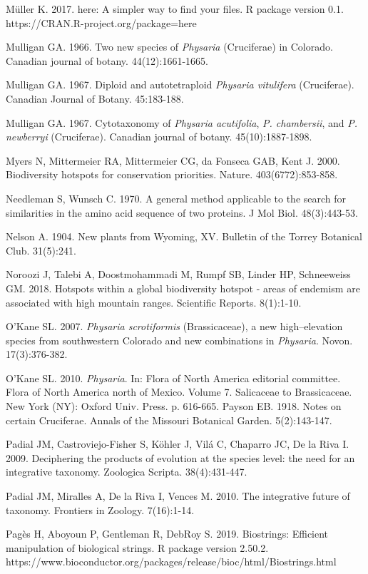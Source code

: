 Müller K. 2017. here: A simpler way to find your files. R package version 0.1. https://CRAN.R-project.org/package=here

Mulligan GA. 1966. Two new species of \textit{Physaria} (Cruciferae) in Colorado. Canadian journal of botany. 44(12):1661-1665.

Mulligan GA. 1967. Diploid and autotetraploid \textit{Physaria vitulifera} (Cruciferae). Canadian Journal of Botany. 45:183-188.

Mulligan GA. 1967. Cytotaxonomy of \textit{Physaria acutifolia}, \textit{P. chambersii}, and \textit{P. newberryi} (Cruciferae). Canadian journal of botany. 45(10):1887-1898.

Myers N, Mittermeier RA, Mittermeier CG, da Fonseca GAB, Kent J. 2000. Biodiversity hotspots for conservation priorities. Nature. 403(6772):853-858.

Needleman S, Wunsch C. 1970. A general method applicable to the search for similarities in the amino acid sequence of two proteins. J Mol Biol. 48(3):443-53.

Nelson A. 1904. New plants from Wyoming, XV. Bulletin of the Torrey Botanical Club. 31(5):241.

Noroozi J, Talebi A, Doostmohammadi M, Rumpf SB, Linder HP, Schneeweiss GM. 2018. Hotspots within a global biodiversity hotspot - areas of endemism are associated with high mountain ranges. Scientific Reports. 8(1):1-10.

O’Kane SL. 2007. \textit{Physaria scrotiformis} (Brassicaceae), a new high–elevation species from southwestern Colorado and new combinations in \textit{Physaria}. Novon. 17(3):376-382.

O’Kane SL. 2010. \textit{Physaria}. In: Flora of North America editorial committee. Flora of North America north of Mexico. Volume 7. Salicaceae to Brassicaceae. New York (NY): Oxford Univ. Press. p. 616-665. 
Payson EB. 1918. Notes on certain Cruciferae. Annals of the Missouri Botanical Garden. 5(2):143-147.

Padial JM, Castroviejo-Fisher S, Köhler J, Vilá C, Chaparro JC, De la Riva I. 2009. Deciphering the products of evolution at the species level: the need for an integrative taxonomy. Zoologica Scripta. 38(4):431-447.

Padial JM, Miralles A, De la Riva I, Vences M. 2010. The integrative future of taxonomy. Frontiers in Zoology. 7(16):1-14.

Pagès H, Aboyoun P, Gentleman R, DebRoy S. 2019. Biostrings: Efficient manipulation of biological strings. R package version 2.50.2. https://www.bioconductor.org/packages/release/bioc/html/Biostrings.html 


